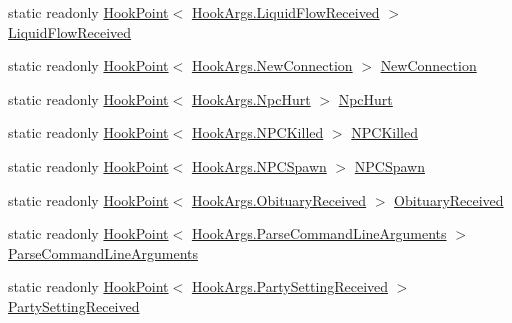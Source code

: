 \begin{DoxyCompactItemize}
\item 
static readonly \hyperlink{classOTA_1_1Plugin_1_1HookPoint}{Hook\+Point}$<$ \hyperlink{structOTA_1_1Plugin_1_1HookArgs_1_1LiquidFlowReceived}{Hook\+Args.\+Liquid\+Flow\+Received} $>$ \hyperlink{classOTA_1_1Plugin_1_1HookPoints_a1a9b4e5aed9d19e8d61869e6e66d19c8}{Liquid\+Flow\+Received}
\item 
static readonly \hyperlink{classOTA_1_1Plugin_1_1HookPoint}{Hook\+Point}$<$ \hyperlink{structOTA_1_1Plugin_1_1HookArgs_1_1NewConnection}{Hook\+Args.\+New\+Connection} $>$ \hyperlink{classOTA_1_1Plugin_1_1HookPoints_a676f83ceabffb6c984928e207a948bb6}{New\+Connection}
\item 
static readonly \hyperlink{classOTA_1_1Plugin_1_1HookPoint}{Hook\+Point}$<$ \hyperlink{structOTA_1_1Plugin_1_1HookArgs_1_1NpcHurt}{Hook\+Args.\+Npc\+Hurt} $>$ \hyperlink{classOTA_1_1Plugin_1_1HookPoints_a47f1d25c965819f79fd8ea9017d6f091}{Npc\+Hurt}
\item 
static readonly \hyperlink{classOTA_1_1Plugin_1_1HookPoint}{Hook\+Point}$<$ \hyperlink{structOTA_1_1Plugin_1_1HookArgs_1_1NPCKilled}{Hook\+Args.\+N\+P\+C\+Killed} $>$ \hyperlink{classOTA_1_1Plugin_1_1HookPoints_a50087b87e577ff4cee3b634d70ff1526}{N\+P\+C\+Killed}
\item 
static readonly \hyperlink{classOTA_1_1Plugin_1_1HookPoint}{Hook\+Point}$<$ \hyperlink{structOTA_1_1Plugin_1_1HookArgs_1_1NPCSpawn}{Hook\+Args.\+N\+P\+C\+Spawn} $>$ \hyperlink{classOTA_1_1Plugin_1_1HookPoints_acae4472a0bdb8b33ad02824c9779b2cd}{N\+P\+C\+Spawn}
\item 
static readonly \hyperlink{classOTA_1_1Plugin_1_1HookPoint}{Hook\+Point}$<$ \hyperlink{structOTA_1_1Plugin_1_1HookArgs_1_1ObituaryReceived}{Hook\+Args.\+Obituary\+Received} $>$ \hyperlink{classOTA_1_1Plugin_1_1HookPoints_a7d6ad8ba249abf2ea0c2771651876c25}{Obituary\+Received}
\item 
static readonly \hyperlink{classOTA_1_1Plugin_1_1HookPoint}{Hook\+Point}$<$ \hyperlink{structOTA_1_1Plugin_1_1HookArgs_1_1ParseCommandLineArguments}{Hook\+Args.\+Parse\+Command\+Line\+Arguments} $>$ \hyperlink{classOTA_1_1Plugin_1_1HookPoints_ab83df90fe0428f4253e3b16dcf94a5f7}{Parse\+Command\+Line\+Arguments}
\item 
static readonly \hyperlink{classOTA_1_1Plugin_1_1HookPoint}{Hook\+Point}$<$ \hyperlink{structOTA_1_1Plugin_1_1HookArgs_1_1PartySettingReceived}{Hook\+Args.\+Party\+Setting\+Received} $>$ \hyperlink{classOTA_1_1Plugin_1_1HookPoints_a0b15aff6692295eee8a84564114dea18}{Party\+Setting\+Received}
\item 

\end{DoxyCompactItemize}
